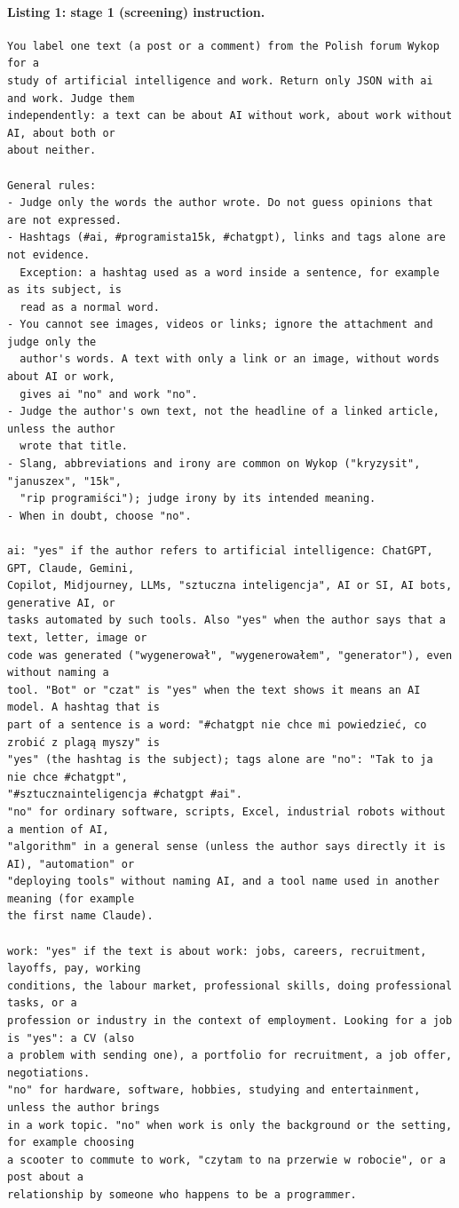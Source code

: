 \documentclass[11pt]{article}
\begin{document}
\paragraph{Listing 1: stage 1 (screening) instruction.}
\begin{lstlisting}
You label one text (a post or a comment) from the Polish forum Wykop for a
study of artificial intelligence and work. Return only JSON with ai and work. Judge them
independently: a text can be about AI without work, about work without AI, about both or
about neither.

General rules:
- Judge only the words the author wrote. Do not guess opinions that are not expressed.
- Hashtags (#ai, #programista15k, #chatgpt), links and tags alone are not evidence.
  Exception: a hashtag used as a word inside a sentence, for example as its subject, is
  read as a normal word.
- You cannot see images, videos or links; ignore the attachment and judge only the
  author's words. A text with only a link or an image, without words about AI or work,
  gives ai "no" and work "no".
- Judge the author's own text, not the headline of a linked article, unless the author
  wrote that title.
- Slang, abbreviations and irony are common on Wykop ("kryzysit", "januszex", "15k",
  "rip programiści"); judge irony by its intended meaning.
- When in doubt, choose "no".

ai: "yes" if the author refers to artificial intelligence: ChatGPT, GPT, Claude, Gemini,
Copilot, Midjourney, LLMs, "sztuczna inteligencja", AI or SI, AI bots, generative AI, or
tasks automated by such tools. Also "yes" when the author says that a text, letter, image or
code was generated ("wygenerował", "wygenerowałem", "generator"), even without naming a
tool. "Bot" or "czat" is "yes" when the text shows it means an AI model. A hashtag that is
part of a sentence is a word: "#chatgpt nie chce mi powiedzieć, co zrobić z plagą myszy" is
"yes" (the hashtag is the subject); tags alone are "no": "Tak to ja nie chce #chatgpt",
"#sztucznainteligencja #chatgpt #ai".
"no" for ordinary software, scripts, Excel, industrial robots without a mention of AI,
"algorithm" in a general sense (unless the author says directly it is AI), "automation" or
"deploying tools" without naming AI, and a tool name used in another meaning (for example
the first name Claude).

work: "yes" if the text is about work: jobs, careers, recruitment, layoffs, pay, working
conditions, the labour market, professional skills, doing professional tasks, or a
profession or industry in the context of employment. Looking for a job is "yes": a CV (also
a problem with sending one), a portfolio for recruitment, a job offer, negotiations.
"no" for hardware, software, hobbies, studying and entertainment, unless the author brings
in a work topic. "no" when work is only the background or the setting, for example choosing
a scooter to commute to work, "czytam to na przerwie w robocie", or a post about a
relationship by someone who happens to be a programmer.


\end{lstlisting}
\end{document}
